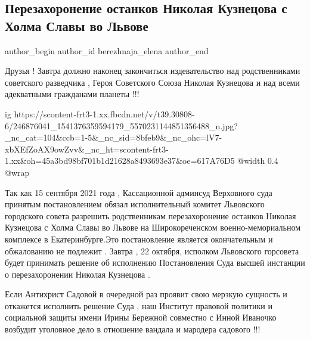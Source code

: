  
 
 
 
 
 
\subsection{Перезахоронение останков Николая Кузнецова с Холма Славы во Львове}
\label{sec:21_10_2021.fb.berezhnaja_elena.1.perezahoronenie_ostanki_kuznecov}
 
\ifcmt
 author_begin
   author_id berezhnaja_elena
 author_end
\fi

Друзья ! Завтра должно наконец закончиться издевательство над родственниками
советского  разведчика , Героя Советского Союза Николая Кузнецова и над всеми
адекватными гражданами планеты !!! 

\ifcmt
  ig https://scontent-frt3-1.xx.fbcdn.net/v/t39.30808-6/246876041_1541376359594179_5570231144851356488_n.jpg?_nc_cat=104&ccb=1-5&_nc_sid=8bfeb9&_nc_ohc=lV7-xbXEfZoAX9owZvv&_nc_ht=scontent-frt3-1.xx&oh=45a3bd98bf701b1d21628a8493693e37&oe=617A76D5
  @width 0.4
  @wrap 
\fi

Так как 15 сентября  2021 года , Кассационной админсуд Верховного суда принятым
постановлением обязал исполнительный комитет Львовского городского совета
разрешить родственникам перезахоронение останков  Николая Кузнецова с Холма
Славы во Львове на Широкореченском военно-мемориальном комплексе в
Екатеринбурге.Это постановление является окончательным и обжалованию не
подлежит .   Завтра , 22 октября, исполком Львовского горсовета  будет
принимать решение об исполнению Постановления Суда высшей инстанции о
перезахоронении Николая Кузнецова . 

Если Антихрист Садовой в очередной раз проявит свою мерзкую сущность и
откажется исполнить решение Суда , наш Институт правовой политики и социальной
защиты имени Ирины Бережной совместно с Инной  Иваночко возбудит уголовное дело
в отношение вандала и  мародера садового !!!

